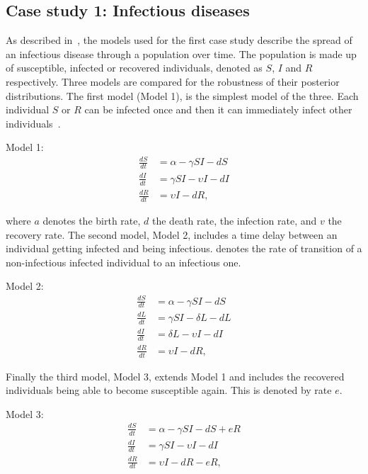 \clearpage
\subsection{Case study 1: Infectious diseases}
\label{sec:cs1}

As described in~\textcite{Toni:2009tr}, the models used for the first case study describe the spread of an infectious disease through a population over time. The population is made up of susceptible, infected or recovered individuals, denoted as $S$, $I$ and $R$ respectively. Three models are compared for the robustness of their posterior distributions. The first model (Model 1), is the simplest model of the three. Each individual $S$ or $R$ can be infected once and then it can immediately infect other individuals~\autocite{Toni:2009tr}.

Model 1:
\begin{align*}
\frac{dS}{dt} &= \alpha - \gamma SI - dS \\
\frac{dI}{dt} &= \gamma SI - \upsilon I - dI \\
\frac{dR}{dt} &= \upsilon I - dR,
\end{align*}

\noindent where $a$ denotes the birth rate, $d$ the death rate, \textgamma{} the infection rate, and $v$ the recovery rate. The second model, Model 2, includes a time delay between an individual getting infected and being infectious. \textdelta{} denotes the rate of transition of a non-infectious infected individual to an infectious one.

Model 2:
\begin{align*}
\frac{dS}{dt} &= \alpha - \gamma SI - dS \\
\frac{dL}{dt} &= \gamma SI - \delta L - dL \\
\frac{dI}{dt} &= \delta L - \upsilon I - dI \\
\frac{dR}{dt} &= \upsilon I - dR,
\end{align*}

\noindent Finally the third model, Model 3, extends Model 1 and includes the recovered individuals being able to become susceptible again. This is denoted by rate $e$.

Model 3:
\begin{align*}
\frac{dS}{dt} &= \alpha - \gamma SI - dS + eR\\
\frac{dI}{dt} &= \gamma SI - \upsilon I - dI \\
\frac{dR}{dt} &= \upsilon I - dR - eR,
\end{align*}

